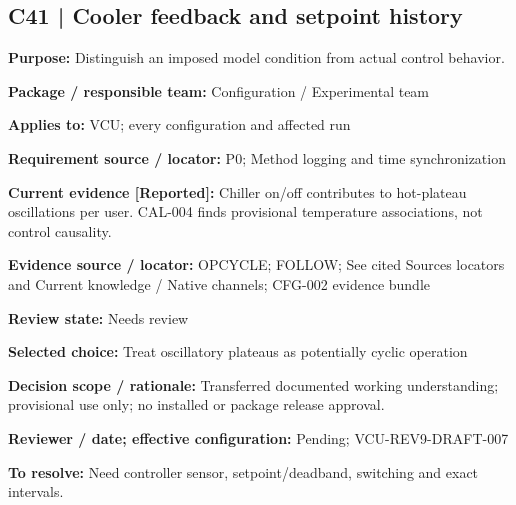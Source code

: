 \documentclass[11pt]{article}
\begin{document}
\par\noindent\begin{minipage}{\textwidth}\small\setlength{\parskip}{2pt}
\subsection*{C41 | Cooler feedback and setpoint history}
\textbf{Purpose:} Distinguish an imposed model condition from actual control behavior.\par
\textbf{Package / responsible team:} Configuration / Experimental team\par
\textbf{Applies to:} VCU; every configuration and affected run\par
\textbf{Requirement source / locator:} P0; Method logging and time synchronization\par
\textbf{Current evidence [Reported]:} Chiller on/off contributes to hot-plateau oscillations per user. CAL-004 finds provisional temperature associations, not control causality.\par
\textbf{Evidence source / locator:} OPCYCLE; FOLLOW; See cited Sources locators and Current knowledge / Native channels; CFG-002 evidence bundle\par
\textbf{Review state:} Needs review\par
\textbf{Selected choice:} Treat oscillatory plateaus as potentially cyclic operation\par
\textbf{Decision scope / rationale:} Transferred documented working understanding; provisional use only; no installed or package release approval.\par
\textbf{Reviewer / date; effective configuration:} Pending; VCU-REV9-DRAFT-007\par
\textbf{To resolve:} Need controller sensor, setpoint/deadband, switching and exact intervals.\par
\end{minipage}\par\vspace{5pt}
\end{document}
